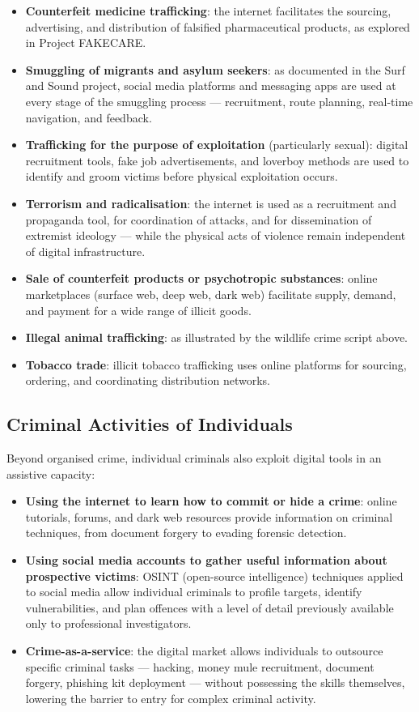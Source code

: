 \documentclass[11pt,a4paper,openany]{report}
\theoremstyle{definition}
\theoremstyle{plain}
\theoremstyle{remark}
\begin{document}
\begin{itemize}
    \item \textbf{Counterfeit medicine trafficking}: the internet facilitates the sourcing, advertising, and distribution of falsified pharmaceutical products, as explored in Project FAKECARE.
    \item \textbf{Smuggling of migrants and asylum seekers}: as documented in the Surf and Sound project, social media platforms and messaging apps are used at every stage of the smuggling process --- recruitment, route planning, real-time navigation, and feedback.
    \item \textbf{Trafficking for the purpose of exploitation} (particularly sexual): digital recruitment tools, fake job advertisements, and loverboy methods are used to identify and groom victims before physical exploitation occurs.
    \item \textbf{Terrorism and radicalisation}: the internet is used as a recruitment and propaganda tool, for coordination of attacks, and for dissemination of extremist ideology --- while the physical acts of violence remain independent of digital infrastructure.
    \item \textbf{Sale of counterfeit products or psychotropic substances}: online marketplaces (surface web, deep web, dark web) facilitate supply, demand, and payment for a wide range of illicit goods.
    \item \textbf{Illegal animal trafficking}: as illustrated by the wildlife crime script above.
    \item \textbf{Tobacco trade}: illicit tobacco trafficking uses online platforms for sourcing, ordering, and coordinating distribution networks.
\end{itemize}

\subsection{Criminal Activities of Individuals}

Beyond organised crime, individual criminals also exploit digital tools in an assistive capacity:

\begin{itemize}
    \item \textbf{Using the internet to learn how to commit or hide a crime}: online tutorials, forums, and dark web resources provide information on criminal techniques, from document forgery to evading forensic detection.
    \item \textbf{Using social media accounts to gather useful information about prospective victims}: OSINT (open-source intelligence) techniques applied to social media allow individual criminals to profile targets, identify vulnerabilities, and plan offences with a level of detail previously available only to professional investigators.
    \item \textbf{Crime-as-a-service}: the digital market allows individuals to outsource specific criminal tasks --- hacking, money mule recruitment, document forgery, phishing kit deployment --- without possessing the skills themselves, lowering the barrier to entry for complex criminal activity.
\end{itemize}
\end{document}
